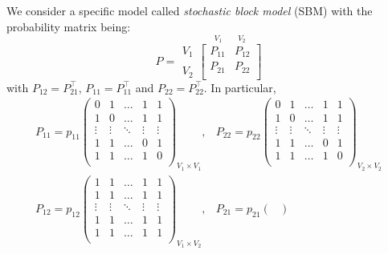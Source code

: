 \begin{eg}
	We consider a specific model called \emph{stochastic block model} (SBM) with the probability matrix being:
	\[
		P = \substack{V_1 \\ \\ V_2}\overset{V_1\qquad V_2}{\begin{bmatrix}
				P_{11} & P_{12} \\
				P_{21} & P_{22} \\
			\end{bmatrix}}
	\]
	with \(P_{12} = P_{21}^{\top}\), \(P_{11} = P_{11}^{\top}\) and \(P_{22} = P_{22}^{\top}\). In particular,
	\[
		\begin{split}
			P_{11} = p_{11}\begin{pmatrix}
				0      & 1      & \dots  & 1      & 1      \\
				1      & 0      & \dots  & 1      & 1      \\
				\vdots & \vdots & \ddots & \vdots & \vdots \\
				1      & 1      & \dots  & 0      & 1      \\
				1      & 1      & \dots  & 1      & 0      \\
			\end{pmatrix}_{V_1 \times V_1}, &
			P_{22} = p_{22}\begin{pmatrix}
				0      & 1      & \dots  & 1      & 1      \\
				1      & 0      & \dots  & 1      & 1      \\
				\vdots & \vdots & \ddots & \vdots & \vdots \\
				1      & 1      & \dots  & 0      & 1      \\
				1      & 1      & \dots  & 1      & 0      \\
			\end{pmatrix}_{V_2 \times V_2}\\
			P_{12} = p_{12}\begin{pmatrix}
				1      & 1      & \dots  & 1      & 1      \\
				1      & 1      & \dots  & 1      & 1      \\
				\vdots & \vdots & \ddots & \vdots & \vdots \\
				1      & 1      & \dots  & 1      & 1      \\
				1      & 1      & \dots  & 1      & 1      \\
			\end{pmatrix}_{V_1 \times V_2}, &
			P_{21} = p_{21}\begin{pmatrix}

\end{pmatrix}
\end{split}\]
\end{eg}
